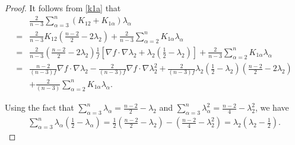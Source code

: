 \documentclass[10pt,a4paper]{amsart}
\begin{document}
\begin{proof}
It follows from \eqref{k1a} that
\begin{equation*}
	\begin{aligned}
		&\frac{2}{n-3}\sum_{\alpha=3}^n(K_{12}+K_{1\alpha })\lambda_\alpha\\
		=& \frac{2}{n-3}K_{12}({\frac{n-2}{2}}-2\lambda_{2})+\frac{2}{n-3}\sum_{\alpha=2}^nK_{1\alpha}\lambda_\alpha\\
		=&\frac{2}{n-3}({\frac{n-2}{2}}-2\lambda_{2})\frac{1}{f}\left[\nabla f\cdot \nabla \lambda_2 +\lambda_2(\frac{1}{2}-\lambda_2) \right]+\frac{2}{n-3}\sum_{\alpha=2}^nK_{1\alpha}\lambda_\alpha\\
		=&\frac{n-2}{(n-3)f}\nabla f\cdot \nabla \lambda_2-\frac{2}{(n-3)f}\nabla f\cdot \nabla \lambda_2^2
		+\frac{2}{(n-3)f}\lambda_2(\frac{1}{2}-\lambda_2)({\frac{n-2}{2}}-2\lambda_{2})\\
		&+\frac{2}{(n-3)}\sum_{\alpha=2}^nK_{1\alpha}\lambda_\alpha.
	\end{aligned}
\end{equation*}

Using the fact that $\sum_{\alpha=3}^n\lambda_\alpha=\frac{n-2}{2}-\lambda_2$ and $\sum_{\alpha=3}^n\lambda_\alpha^2=\frac{n-2}{4}-\lambda_2^2$,
we have
\begin{align*}
\sum_{\alpha=3}^n \lambda_\alpha(\frac{1}{2}-\lambda_\alpha)=\frac{1}{2}(\frac{n-2}{2}-\lambda_2)-(\frac{n-2}{4}-\lambda_2^2)=\lambda_2(\lambda_2-\frac{1}{2}).
\end{align*}


\end{proof}
\end{document}
